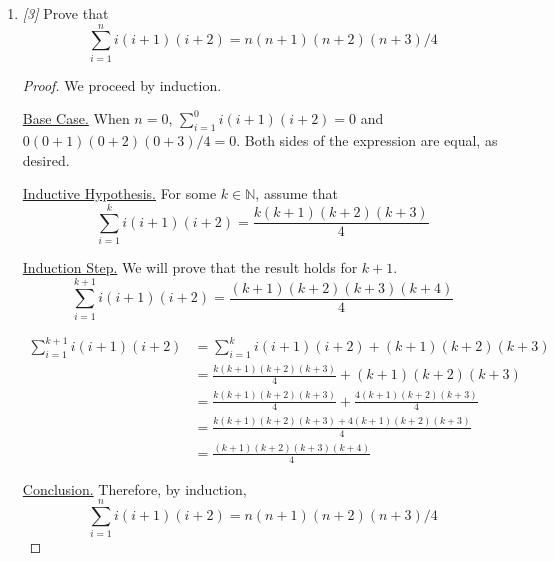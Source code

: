 \documentclass[10pt, letterpaper]{article}
\numberwithin{equation}{section}
\begin{document}
\begin{enumerate}
\begin{proof}
            \underline{Conclusion.} Therefore, by induction,
            $\sum_{i = 1}^{n} i^3 = n^2(n + 1)^2 / 4$ for $n \geq 0$.
        \end{proof}

        \item \textit{[3]} Prove that
        \begin{equation*}
            \sum_{i = 1}^{n} i(i + 1)(i + 2) = n(n + 1)(n + 2)(n + 3) / 4
        \end{equation*}

        \begin{proof}
            We proceed by induction.

            \underline{Base Case.} When $n = 0$, $\sum_{i = 1}^{0} i(i + 1)(i + 2) = 0$ and
            $0(0 + 1)(0 + 2)(0 + 3) / 4 = 0$. Both sides of the expression are equal, as desired.

            \underline{Inductive Hypothesis.} For some $k \in \mathbb{N}$, assume that
            \begin{equation*}
                \sum_{i = 1}^{k} i(i + 1)(i + 2) = \frac{k(k + 1)(k + 2)(k + 3)}{4}
            \end{equation*}

            \underline{Induction Step.} We will prove that the result holds for $k + 1$.
            \begin{equation*}
                \sum_{i = 1}^{k + 1} i(i + 1)(i + 2) = \frac{(k + 1)(k + 2)(k + 3)(k + 4)}{4}
            \end{equation*}

            \begin{align*}
                \sum_{i = 1}^{k + 1} i(i + 1)(i + 2)
                & = \sum_{i = 1}^{k} i(i + 1)(i + 2) + (k + 1)(k + 2)(k + 3) \\
                & = \frac{k(k + 1)(k + 2)(k + 3)}{4} + (k + 1)(k + 2)(k + 3) \\
                & = \frac{k(k + 1)(k + 2)(k + 3)}{4} + \frac{4(k + 1)(k + 2)(k + 3)}{4} \\
                & = \frac{k(k + 1)(k + 2)(k + 3) + 4(k + 1)(k + 2)(k + 3)}{4} \\
                & = \frac{(k + 1)(k + 2)(k + 3)(k + 4)}{4}
            \end{align*}

            \underline{Conclusion.} Therefore, by induction,
            \begin{equation*}
                \sum_{i = 1}^{n} i(i + 1)(i + 2) = n(n + 1)(n + 2)(n + 3) / 4
            \end{equation*}
        \end{proof}


\end{enumerate}
\end{document}
